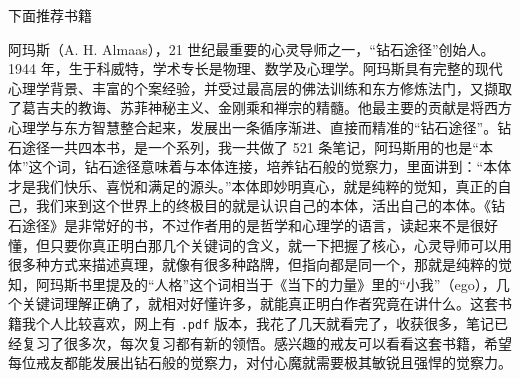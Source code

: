 下面推荐书籍

\begin{book}
    阿玛斯（A. H. Almaas），21 世纪最重要的心灵导师之一，“钻石途径”创始人。1944 年，生于科威特，学术专长是物理、数学及心理学。阿玛斯具有完整的现代心理学背景、丰富的个案经验，并受过最高层的佛法训练和东方修炼法门，又撷取了葛吉夫的教诲、苏菲神秘主义、金刚乘和禅宗的精髓。他最主要的贡献是将西方心理学与东方智慧整合起来，发展出一条循序渐进、直接而精准的“钻石途径”。钻石途径一共四本书，是一个系列，我一共做了 521 条笔记，阿玛斯用的也是“本体”这个词，钻石途径意味着与本体连接，培养钻石般的觉察力，里面讲到：“本体才是我们快乐、喜悦和满足的源头。”本体即妙明真心，就是纯粹的觉知，真正的自己，我们来到这个世界上的终极目的就是认识自己的本体，活出自己的本体。《钻石途径》是非常好的书，不过作者用的是哲学和心理学的语言，读起来不是很好懂，但只要你真正明白那几个关键词的含义，就一下把握了核心，心灵导师可以用很多种方式来描述真理，就像有很多种路牌，但指向都是同一个，那就是纯粹的觉知，阿玛斯书里提及的“人格”这个词相当于《当下的力量》里的“小我”（ego），几个关键词理解正确了，就相对好懂许多，就能真正明白作者究竟在讲什么。这套书籍我个人比较喜欢，网上有 \texttt{.pdf} 版本，我花了几天就看完了，收获很多，笔记已经复习了很多次，每次复习都有新的领悟。感兴趣的戒友可以看看这套书籍，希望每位戒友都能发展出钻石般的觉察力，对付心魔就需要极其敏锐且强悍的觉察力。
\end{book}
